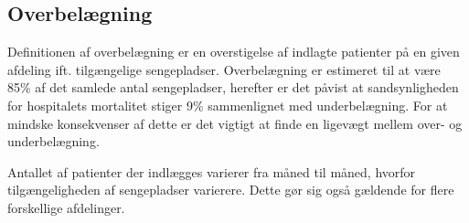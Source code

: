 \subsection{Overbelægning}
Definitionen af overbelægning er en overstigelse af indlagte patienter på en given afdeling ift. tilgængelige sengepladser. Overbelægning er estimeret til at være 85\% af det samlede antal sengepladser, herefter er det påvist at sandsynligheden for hospitalets mortalitet  stiger 9\% sammenlignet med underbelægning. \citep{dodlighed2014} For at mindske konsekvenser af dette er det vigtigt at finde en ligevægt mellem over- og underbelægning.  

\noindent
Antallet af patienter der indlægges varierer fra måned til måned, hvorfor tilgængeligheden af sengepladser varierere. Dette gør sig også gældende for flere forskellige afdelinger. 


